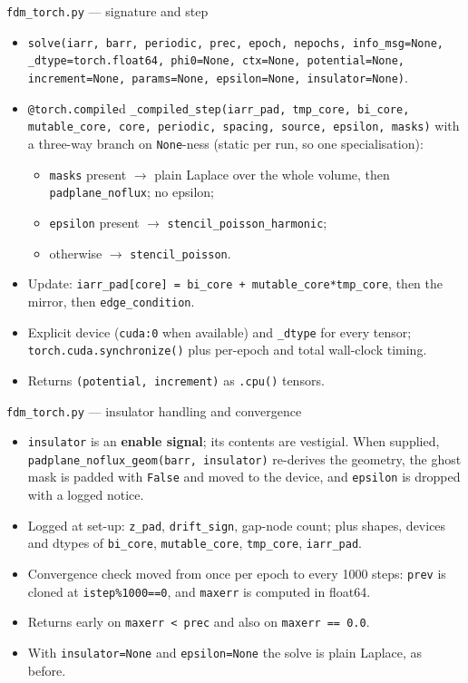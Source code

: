 \documentclass[10pt,aspectratio=169]{beamer}
\newcommand{\ti}[1]{\texttt{\footnotesize #1}}
\begin{document}
\begin{frame}[allowframebreaks]{\texttt{fdm\_torch.py} --- signature and step}
  \begin{itemize}\small
  \item \ti{solve(iarr, barr, periodic, prec, epoch, nepochs, info\_msg=None,
        \_dtype=torch.float64, phi0=None, ctx=None, potential=None, increment=None,
        params=None, epsilon=None, insulator=None)}.
  \item \ti{@torch.compile}d \ti{\_compiled\_step(iarr\_pad, tmp\_core, bi\_core,
        mutable\_core, core, periodic, spacing, source, epsilon, masks)} with a three-way
        branch on \ti{None}-ness (static per run, so one specialisation):
    \begin{itemize}
    \item \ti{masks} present $\rightarrow$ plain Laplace over the whole volume, then
          \ti{padplane\_noflux}; no epsilon;
    \item \ti{epsilon} present $\rightarrow$ \ti{stencil\_poisson\_harmonic};
    \item otherwise $\rightarrow$ \ti{stencil\_poisson}.
    \end{itemize}
  \item Update: \ti{iarr\_pad[core] = bi\_core + mutable\_core*tmp\_core}, then the mirror,
        then \ti{edge\_condition}.
  \item Explicit device (\ti{cuda:0} when available) and \ti{\_dtype} for every tensor;
        \ti{torch.cuda.synchronize()} plus per-epoch and total wall-clock timing.
  \item Returns \ti{(potential, increment)} as \ti{.cpu()} tensors.
  \end{itemize}
\end{frame}

\begin{frame}{\texttt{fdm\_torch.py} --- insulator handling and convergence}
  \begin{itemize}\small
  \item \ti{insulator} is an \textbf{enable signal}; its contents are vestigial. When
        supplied, \ti{padplane\_noflux\_geom(barr, insulator)} re-derives the geometry, the
        ghost mask is padded with \ti{False} and moved to the device, and \ti{epsilon} is
        dropped with a logged notice.
  \item Logged at set-up: \ti{z\_pad}, \ti{drift\_sign}, gap-node count; plus shapes,
        devices and dtypes of \ti{bi\_core}, \ti{mutable\_core}, \ti{tmp\_core},
        \ti{iarr\_pad}.
  \item Convergence check moved from once per epoch to every 1000 steps: \ti{prev} is
        cloned at \ti{istep\%1000==0}, and \ti{maxerr} is computed in float64.
  \item Returns early on \ti{maxerr < prec} and also on \ti{maxerr == 0.0}.
  \item With \ti{insulator=None} and \ti{epsilon=None} the solve is plain Laplace, as
        before.
  \end{itemize}
\end{frame}
\end{document}
